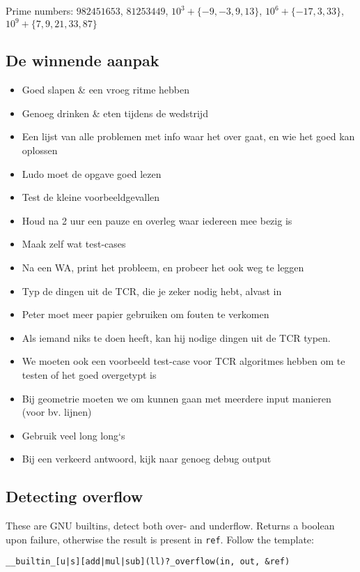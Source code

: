 \documentclass{article}
\begin{document}
Prime numbers: $\mathit{982451653}$, $\mathit{81253449}$, $10^3 + \{-9,-3,9,13\}$, $10^6 + \{-17, 3, 33\}$, $10^9 + \{7,9,21,33,87\}$

\subsection{De winnende aanpak}

\begin{itemize}
	\setlength\itemsep{-.25em}
	\item Goed slapen \& een vroeg ritme hebben
	\item Genoeg drinken \& eten tijdens de wedstrijd
	\item Een lijst van alle problemen met info waar het over gaat, en wie het goed kan oplossen
	\item Ludo moet de opgave goed lezen
	\item Test de kleine voorbeeldgevallen
	\item Houd na 2 uur een pauze en overleg waar iedereen mee bezig is
	\item Maak zelf wat test-cases
	\item Na een WA, print het probleem, en probeer het ook weg te leggen
	\item Typ de dingen uit de TCR, die je zeker nodig hebt, alvast in
	\item Peter moet meer papier gebruiken om fouten te verkomen
	\item Als iemand niks te doen heeft, kan hij nodige dingen uit de TCR typen.
	\item We moeten ook een voorbeeld test-case voor TCR algoritmes hebben om te testen of het goed overgetypt is
	\item Bij geometrie moeten we om kunnen gaan met meerdere input manieren (voor bv. lijnen)
	\item Gebruik veel long long`s
	\item Bij een verkeerd antwoord, kijk naar genoeg debug output
\end{itemize}

\subsection{Detecting overflow}
These are GNU builtins, detect both over- and underflow. Returns a boolean upon failure, otherwise the result is present in \texttt{ref}. Follow the template: 

\texttt{\_\_builtin\_[u|s][add|mul|sub](ll)?\_overflow(in, out, \&ref)} 
\end{document}
